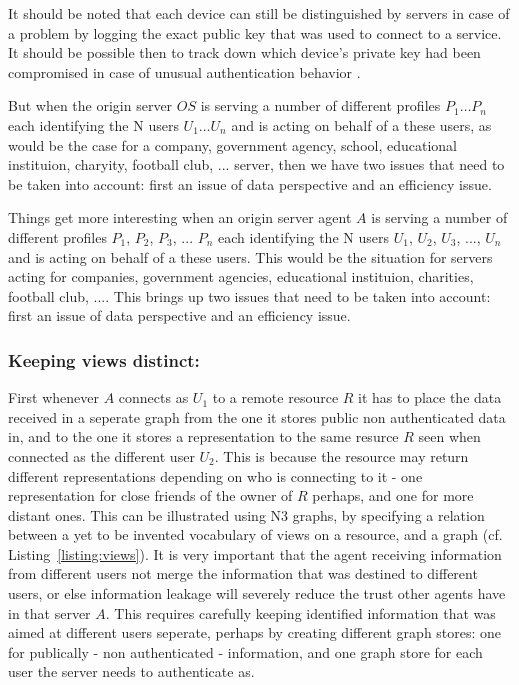 \documentclass[a4paper]{llncs}
\begin{document}
It should be noted that each device can still be distinguished by servers in case of a problem by logging the exact public key that was used to connect to a service. 
It should be possible then to track down which device's private key had been compromised in case of unusual authentication behavior . 

But when the origin server $OS$ is serving a number of different profiles $P_1 \ldots P_n$ each identifying the N users $U_1 \ldots U_n$ and is acting on behalf of a these users, as would be the case for a company, government agency, school, educational instituion, charyity, football club, ... server, then we have two issues that need to be taken into account: first an issue of data perspective and an efficiency issue. 

Things get more interesting when an origin server agent $A$ is serving a number of different profiles $P_1$, $P_2$, $P_3$, ... $P_n$ each identifying the N users $U_1$, $U_2$, $U_3$, ..., $U_n$ and is acting on behalf of a these users.
This would be the situation for servers acting for companies, government agencies, educational instituion, charities, football club, ....
This brings up two issues that need to be taken into account: first an issue of data perspective and an efficiency issue. 

\subsubsection{Keeping views distinct: }

First whenever $A$ connects as $U_1$ to a remote resource $R$ it has to place the data received in a seperate graph from the one it stores public non authenticated data in, and to the one it stores a representation to the same resurce $R$ seen when connected as the different user $U_2$. 
This is because the resource may return different representations depending on who is connecting to it - one representation for close friends of the owner of $R$ perhaps, and one for more distant ones. 
This can be illustrated using N3 graphs, by specifying a relation between a yet to be invented vocabulary of views on a resource, and a graph (cf. Listing~\ref{listing:views}). 
It is very important that the agent receiving information from different users not merge the information that was destined to different users, or else information leakage will severely reduce the trust other agents have in that server $A$. 
This requires carefully keeping identified information that was aimed at different users seperate, perhaps by creating different graph stores: one for publically - non authenticated - information, and one graph store for each user the server needs to authenticate as.
\end{document}
